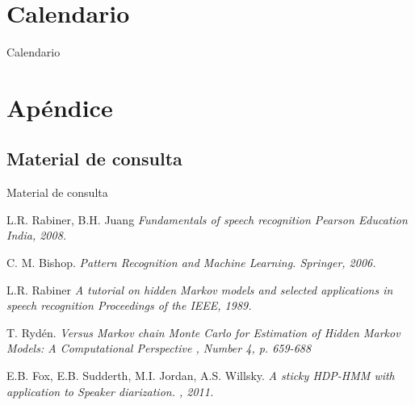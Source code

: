 \documentclass[10pt]{beamer}
\begin{document}
\section{Calendario}
\begin{frame}{Calendario}

\begin{center}

\end{center}
\end{frame}

\section{Apéndice}
\subsection{Material de consulta}

\begin{frame}{Material de consulta}
  
  \footnotesize {
  \begin{thebibliography}{10}
    
  \beamertemplatebookbibitems

  {L.R. Rabiner, B.H. Juang}
    \newblock \em{Fundamentals of speech recognition}
    \newblock Pearson Education India, 2008.
  
    {C. M. Bishop.}
    \newblock \em{Pattern Recognition and Machine Learning}.
    \newblock Springer, 2006.
     
  \beamertemplatearticlebibitems
    
    {L.R. Rabiner}
    \newblock \em{A tutorial on hidden Markov models and selected 
      applications in speech recognition}
    \newblock Proceedings of the IEEE, 1989.

    {T. Rydén.}
    \newblock \em{Versus Markov chain Monte Carlo for Estimation of Hidden 
    Markov Models: A Computational Perspective}
    , Number 4, p. 659-688
    
    {E.B. Fox, E.B. Sudderth, M.I. Jordan, A.S. Willsky.}
    \newblock \em{A sticky HDP-HMM with application to Speaker diarization}.
    , 2011.
     
  \end{thebibliography}
  }
\end{frame}
\end{document}
